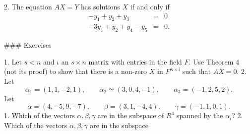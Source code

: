 2. The equation \(AX=Y\) has solutions \(X\) if and only if \[\begin{array}{rll}-y_{1}+y_{2}+y_{3}&=&0\\ -3y_{1}+y_{2}+y_{4}-y_{5}&=&0.\end{array}\]

### Exercises

1. Let \(s<n\) and \(\iota\) an \(s\times n\) matrix with entries in the field \(F\). Use Theorem 4 (not its proof) to show that there is a non-zero \(X\) in \(F^{\mathsf{w}\times\mathsf{i}}\) such that \(AX=0\).
2. Let \[\alpha_{1}=(1,1,-2,1),\qquad\alpha_{2}\simeq(3,0,4,-1),\qquad\alpha_{3}=(-1,2, 5,2).\] Let \[\alpha=(4,-5,9,-7),\qquad\beta=(3,1,-4,4),\qquad\gamma=(-1,1,0,1).\] 1. Which of the vectors \(\alpha,\beta,\gamma\) are in the subspace of \(R^{4}\) spanned by the \(\alpha_{i}\)? 2. Which of the vectors \(\alpha,\beta,\gamma\) are in the subspace 